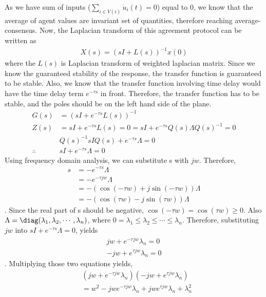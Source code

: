 \documentclass{article}
\begin{document}
\begin{problem}
    As we have sum of inputs ($\sum_{i \in V(i)} \dot u_i(t) = 0$) equal to 0, we know that the average of agent values are invariant set of quantities, therefore reaching average-consensus. Now, the Laplacian transform of this agreement protocol can be written as
    \begin{align*}
        X(s) = (sI + L(s))^{-1} x(0)
    \end{align*}
    where the $L(s)$ is Laplacian transform of weighted laplacian matrix. Since we know the guaranteed stability of the response, the transfer function is guaranteed to be stable. Also, we know that the transfer function involving time delay would have the time delay term $e^{-\tau s}$ in front. Therefore, the transfer function has to be stable, and the poles should be on the left hand side of the plane.
    \begin{align*}
        G(s) &= (sI + e^{-\tau s} L(s))^{-1}\\
        Z(s) &= sI + e^{-\tau s} L(s) = 0 = sI + e^{-\tau s} Q(s) \Lambda Q(s)^{-1} = 0\\
        &Q(s)^{-1} sI Q(s)+ e^{-\tau s} \Lambda = 0\\
        \therefore &sI + e^{-\tau s} \Lambda  = 0
    \end{align*}
    Using frequency domain analysis, we can substitute s with $jw$. Therefore, 
    \begin{align*}
        s & = - e^{-\tau s} \Lambda \\
        &= -  e^{-\tau jw} \Lambda \\
        &= - (\cos{(-\tau w)}+ j\sin{(-\tau w)})\Lambda \\
        &= -(\cos{(\tau w)}- j \sin{(\tau w)})\Lambda 
    \end{align*}.
    Since the real part of s should be negative, $\cos{(-\tau w)}=\cos{(\tau w)} \geq 0$. Also $\Lambda = \diag (\lambda_1, \lambda_2, \cdots, \lambda_n)$, where $0= \lambda_1 \leq \lambda_2 \leq \cdots \leq \lambda_n$. Therefore, substituting $jw$ into $sI + e^{-\tau s} \Lambda  = 0$, yields 
    \begin{align*}
        jw + e^{-\tau jw} \lambda_n= 0\\
        -jw + e^{\tau jw} \lambda_n= 0
    \end{align*}.
    Multiplying those two equations yields,
    \begin{align*}
        &(jw + e^{-\tau jw} \lambda_n)(-jw + e^{\tau jw} \lambda_n) \\
        &= w^2 - jwe^{-\tau jw} \lambda_n + jw e^{\tau jw} \lambda_n + \lambda_n^2\\

\end{align*}
\end{problem}
\end{document}
